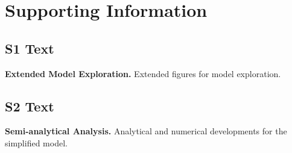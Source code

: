 \documentclass[10pt,letterpaper,draft]{article}
\begin{document}
\section*{Supporting Information}



\subsection*{S1 Text}
\label{S1_Text}
{\bf Extended Model Exploration.} Extended figures for model exploration.

\subsection*{S2 Text}
\label{S2_Text}
{\bf Semi-analytical Analysis.} Analytical and numerical developments for the simplified model.











\nolinenumbers

%
%
% 
\end{document}
